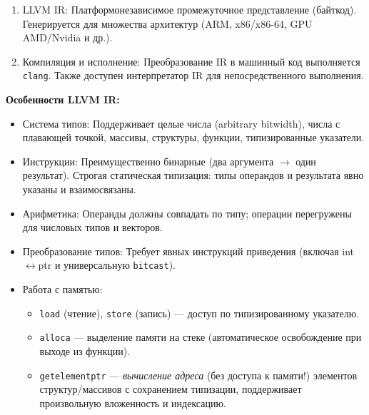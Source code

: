 \begin{enumerate}
  \item LLVM IR: Платформонезависимое промежуточное представление (байткод). Генерируется для множества архитектур (ARM, x86/x86-64, GPU AMD/Nvidia и др.).
  
  \item Компиляция и исполнение: Преобразование IR в машинный код выполняется \texttt{clang}. Также доступен интерпретатор IR для непосредственного выполнения.
\end{enumerate}

\textbf{Особенности LLVM IR:}
\begin{itemize}
  \item Система типов: Поддерживает целые числа (arbitrary bitwidth), числа с плавающей точкой, массивы, структуры, функции, типизированные указатели.
  
  \item Инструкции: Преимущественно бинарные (два аргумента $\rightarrow$ один результат). Строгая статическая типизация: типы операндов и результата явно указаны и взаимосвязаны.
  
  \item Арифметика: Операнды должны совпадать по типу; операции перегружены для числовых типов и векторов.
  
  \item Преобразование типов: Требует явных инструкций приведения (включая int$\leftrightarrow$ptr и универсальную \texttt{bitcast}).
  
  \item Работа с памятью:
  \begin{itemize}
    \item \texttt{load} (чтение), \texttt{store} (запись) — доступ по типизированному указателю.
    \item \texttt{alloca} — выделение памяти на стеке (автоматическое освобождение при выходе из функции).
    \item \texttt{getelementptr} — \emph{вычисление адреса} (без доступа к памяти!) элементов структур/массивов с сохранением типизации, поддерживает произвольную вложенность и индексацию.
  \end{itemize}
\end{itemize}


\newpage

